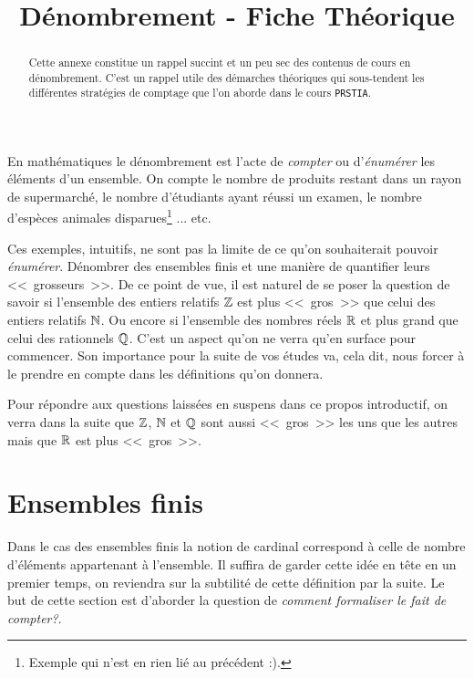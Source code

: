 \documentclass[12pt, a4paper]{article}
\title{%
  {\huge Dénombrement - Fiche Théorique}%
}
\author{}
\date{}
\begin{document}
\maketitle\thispagestyle{fancy}

\begin{abstract}
  Cette annexe constitue un rappel succint et un peu sec des contenus
  de cours en dénombrement. C'est un rappel utile des démarches
  théoriques qui sous-tendent les différentes stratégies de comptage
  que l'on aborde dans le cours \texttt{PRSTIA}.
\end{abstract}


En mathématiques le dénombrement est l'acte de \emph{compter} ou
d'\emph{énumérer} les éléments d'un ensemble. On compte le nombre de
produits restant dans un rayon de supermarché, le nombre d'étudiants
ayant réussi un examen, le nombre d'espèces animales
disparues\footnote{Exemple qui n'est en rien lié au précédent :).}
... etc.

Ces exemples, intuitifs, ne sont pas la limite de ce qu'on
souhaiterait pouvoir \emph{énumérer}. Dénombrer des ensembles finis et
une manière de quantifier leurs <<~grosseurs~>>. De ce point de
vue, il est naturel de se poser la question de savoir si l'ensemble
des entiers relatifs $\mathbb{Z}$ est plus <<~gros~>> que celui des
entiers relatifs $\mathbb{N}$. Ou encore si l'ensemble des nombres réels $\mathbb{R}$
et plus grand que celui des rationnels $\mathbb{Q}$. C'est un aspect qu'on ne
verra qu'en surface pour commencer. Son importance pour la suite de
vos études va, cela dit, nous forcer à le prendre en compte dans les
définitions qu'on donnera.

\vspace{\baselineskip}
Pour répondre aux questions laissées en suspens dans ce propos
introductif, on verra dans la suite que $\mathbb{Z}$, $\mathbb{N}$ et $\mathbb{Q}$ sont aussi
<<~gros~>> les uns que les autres mais que $\mathbb{R}$ est plus <<~gros~>>.

\section{Ensembles finis}

Dans le cas des ensembles finis la notion de cardinal correspond à
celle de nombre d'éléments appartenant à l'ensemble. Il suffira de
garder cette idée en tête en un premier temps, on reviendra sur la
subtilité de cette définition par la suite. Le but de cette section
est d'aborder la question de \emph{comment formaliser le fait de
  compter?}.
\end{document}
